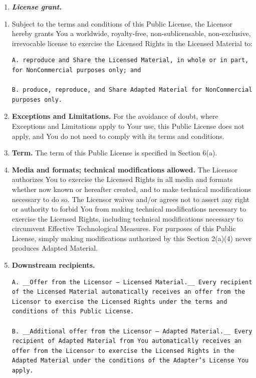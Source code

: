 \documentclass[]{book}
\providecommand{\tightlist}{%
  \setlength{\itemsep}{0pt}\setlength{\parskip}{0pt}}
\begin{document}
\begin{enumerate}
\def\labelenumi{\alph{enumi}.}
\tightlist
\item
  \textbf{\emph{License grant.}}
\end{enumerate}

\begin{enumerate}
\def\labelenumi{\arabic{enumi}.}
\item
  Subject to the terms and conditions of this Public License, the
  Licensor hereby grants You a worldwide, royalty-free,
  non-sublicensable, non-exclusive, irrevocable license to exercise the
  Licensed Rights in the Licensed Material to:

\begin{verbatim}
A. reproduce and Share the Licensed Material, in whole or in part, for NonCommercial purposes only; and

B. produce, reproduce, and Share Adapted Material for NonCommercial purposes only.
\end{verbatim}
\item
  \textbf{Exceptions and Limitations.} For the avoidance of doubt, where
  Exceptions and Limitations apply to Your use, this Public License does
  not apply, and You do not need to comply with its terms and
  conditions.
\item
  \textbf{Term.} The term of this Public License is specified in Section
  6(a).
\item
  \textbf{Media and formats; technical modifications allowed.} The
  Licensor authorizes You to exercise the Licensed Rights in all media
  and formats whether now known or hereafter created, and to make
  technical modifications necessary to do so. The Licensor waives and/or
  agrees not to assert any right or authority to forbid You from making
  technical modifications necessary to exercise the Licensed Rights,
  including technical modifications necessary to circumvent Effective
  Technological Measures. For purposes of this Public License, simply
  making modifications authorized by this Section 2(a)(4) never produces
  Adapted Material.
\item
  \textbf{Downstream recipients.}

\begin{verbatim}
A. __Offer from the Licensor – Licensed Material.__ Every recipient of the Licensed Material automatically receives an offer from the Licensor to exercise the Licensed Rights under the terms and conditions of this Public License.

B. __Additional offer from the Licensor – Adapted Material.__ Every recipient of Adapted Material from You automatically receives an offer from the Licensor to exercise the Licensed Rights in the Adapted Material under the conditions of the Adapter’s License You apply.


\end{verbatim}
\end{enumerate}
\end{document}
